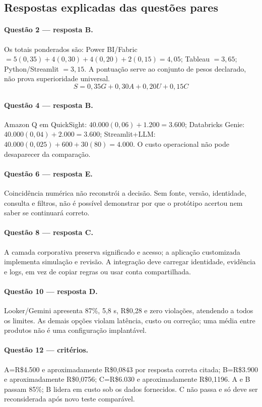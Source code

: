 \newpage
\subsection{Respostas explicadas das questões pares}

\paragraph{Questão 2 — resposta B.} Os totais ponderados são: Power BI/Fabric $=5(0{,}35)+4(0{,}30)+4(0{,}20)+2(0{,}15)=4{,}05$; Tableau $=3{,}65$; Python/Streamlit $=3{,}15$. A pontuação serve ao conjunto de pesos declarado, não prova superioridade universal.
\[S=0{,}35G+0{,}30A+0{,}20U+0{,}15C\]

\paragraph{Questão 4 — resposta B.} Amazon Q em QuickSight: $40.000(0{,}06)+1.200=3.600$; Databricks Genie: $40.000(0{,}04)+2.000=3.600$; Streamlit+LLM: $40.000(0{,}025)+600+30(80)=4.000$. O custo operacional não pode desaparecer da comparação.

\paragraph{Questão 6 — resposta E.} Coincidência numérica não reconstrói a decisão. Sem fonte, versão, identidade, consulta e filtros, não é possível demonstrar por que o protótipo acertou nem saber se continuará correto.

\paragraph{Questão 8 — resposta C.} A camada corporativa preserva significado e acesso; a aplicação customizada implementa simulação e revisão. A integração deve carregar identidade, evidência e logs, em vez de copiar regras ou usar conta compartilhada.

\paragraph{Questão 10 — resposta D.} Looker/Gemini apresenta 87\%, 5,8 s, R\$0,28 e zero violações, atendendo a todos os limites. As demais opções violam latência, custo ou correção; uma média entre produtos não é uma configuração implantável.

\paragraph{Questão 12 — critérios.} A=R\$4.500 e aproximadamente R\$0,0843 por resposta correta citada; B=R\$3.900 e aproximadamente R\$0,0756; C=R\$6.030 e aproximadamente R\$0,1196. A e B passam 85\%; B lidera em custo sob os dados fornecidos. C não passa e só deve ser reconsiderada após novo teste comparável.

